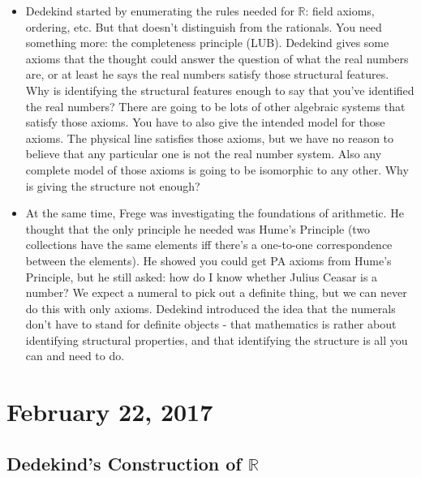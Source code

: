 \documentclass[12pt]{article}
\theoremstyle{definition}
\begin{document}
\begin{itemize}
    \item
        Dedekind started by enumerating the rules needed for $\mathbb{R}$:
        field axioms, ordering, etc. But that doesn't distinguish from the
        rationals. You need something more: the completeness principle (LUB).
        Dedekind gives some axioms that the thought could answer the question
        of what the real numbers are, or at least he says the real numbers
        satisfy those structural features. Why is identifying the structural
        features enough to say that you've identified the real numbers? There
        are going to be lots of other algebraic systems that satisfy those
        axioms. You have to also give the intended model for those axioms. The
        physical line satisfies those axioms, but we have no reason to believe
        that any particular one is not the real number system. Also any
        complete model of those axioms is going to be isomorphic to any other.
        Why is giving the structure not enough?
    \item
        At the same time, Frege was investigating the foundations of
        arithmetic. He thought that the only principle he needed was Hume's
        Principle (two collections have the same elements iff there's a
        one-to-one correspondence between the elements). He showed you could
        get PA axioms from Hume's Principle, but he still asked: how do I know
        whether Julius Ceasar is a number? We expect a numeral to pick out a
        definite thing, but we can never do this with only axioms. Dedekind
        introduced the idea that the numerals don't have to stand for definite
        objects - that mathematics is rather about identifying structural
        properties, and that identifying the structure is all you can and need
        to do. 
\end{itemize}

\section{February 22, 2017}

\subsection{Dedekind's Construction of $\mathbb{R}$}
\end{document}
